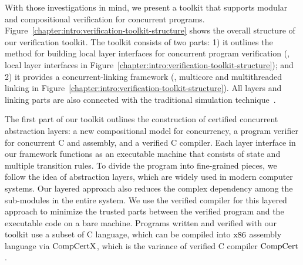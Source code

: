 With those investigations in mind, 
we present a toolkit that supports modular and compositional verification for concurrent programs.
Figure~\ref{chapter:intro:verification-toolkit-structure}  shows the overall structure of our verification toolkit. 
The toolkit consists of two parts: 
1) it outlines the method for building local layer interfaces for concurrent program verification (\ie, local layer interfaces in Figure~\ref{chapter:intro:verification-toolkit-structure}); 
and 2) it provides a concurrent-linking framework (\ie, multicore and multithreaded linking in Figure~\ref{chapter:intro:verification-toolkit-structure}). 
All layers and linking parts are also connected with the traditional simulation technique~\cite{compcert, deepspec}. 

 
The first part of our toolkit outlines the construction of certified concurrent abstraction layers: a new compositional model for concurrency, 
a program verifier for concurrent C and assembly, and a verified C compiler. 
Each layer interface in our framework functions as an executable machine that consists of state and multiple transition rules. 
To divide the program into fine-grained pieces, we follow the idea of abstraction layers, which are widely used in modern computer systems. 
Our layered approach also reduces the complex dependency among the sub-modules in the entire system. 
We use the verified compiler for this layered approach to minimize the trusted parts between the verified program and the executable code on a bare machine. 
Programs written and verified with our toolkit use a subset of C language, which can be compiled into $\mathrm{x86}$ assembly language via $\mathrm{CompCertX}$, which is the variance of verified C compiler $\mathrm{CompCert}$.  

